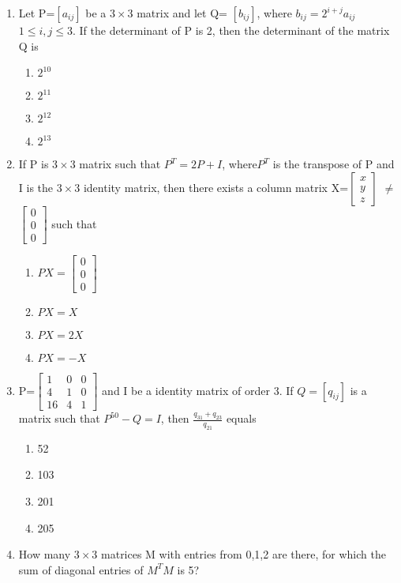 \begin{enumerate}[label=\arabic*.,ref=\thesubsection.\theenumi]
\begin{enumerate}
\end{enumerate}
\item Let P=$[a_{ij}]$ be a $3 \times 3$ matrix and let Q= $[b_{ij}]$, where $b_{ij}=2^{i+j}a_{ij}$  $1\leq i,j\leq3$. If the determinant of P is 2, then the determinant of the matrix Q is 
\begin{enumerate}
 \item $2^{10}$
 \item $2^{11}$
 \item $2^{12}$
 \item $2^{13}$
\end{enumerate}
\item If P is $3\times3$ matrix such that $P^T=2P+I$, where$P^T$ is the transpose of P and I is the $3\times3$ identity matrix, then there exists a column matrix X=$\begin{bmatrix} x \\ y \\ z \end{bmatrix}$ $\neq$ $\begin{bmatrix} 0 \\ 0 \\ 0 \end{bmatrix}$ such that 
\begin{enumerate}
 \item $PX=\begin{bmatrix} 0 \\ 0 \\ 0 \end{bmatrix}$
 \item $PX=X$
 \item $PX=2X$
 \item $PX=-X$
\end{enumerate}
\item P=$\begin{bmatrix} 1 & 0 & 0  \\ 4 & 1 & 0  \\ 16 & 4 & 1  \end{bmatrix}$ and I be a identity matrix of order 3. If $Q=[q_{ij}]$ is a matrix such that $P^{50}-Q = I$, then $\frac{q_{31}+q_{23}}{q_{21}}$ equals
\begin{enumerate}
 \item 52
 \item 103
 \item 201
 \item 205
\end{enumerate}
\item How many $3\times3$ matrices M with entries from {0,1,2} are there, for which the sum of diagonal entries of $M^TM$ is 5?

\end{enumerate}
